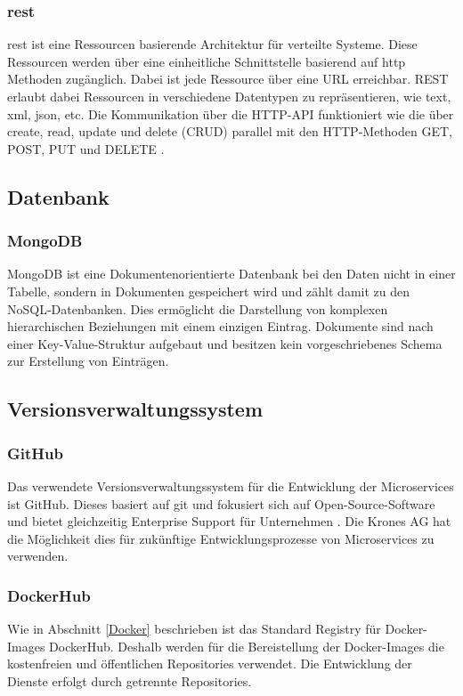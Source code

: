 \subsubsection{\ac{rest}}
\acs{rest} ist eine Ressourcen basierende Architektur für verteilte Systeme.
Diese Ressourcen werden über eine einheitliche Schnittstelle basierend auf 
\acs{http} Methoden zugänglich.
Dabei ist jede Ressource über eine URL erreichbar.
REST erlaubt dabei Ressourcen in verschiedene Datentypen zu repräsentieren, wie text, xml, json, etc.
Die Kommunikation über die HTTP-API funktioniert wie die über create, read, update und delete (CRUD) parallel mit den HTTP-Methoden GET, POST, PUT und DELETE \cite{fundamentalsRestfulAPI}.

\subsection{Datenbank}

\subsubsection{MongoDB}

MongoDB ist eine Dokumentenorientierte Datenbank bei den Daten nicht in einer Tabelle, 
sondern in Dokumenten gespeichert wird und zählt damit zu den NoSQL-Datenbanken.
Dies ermöglicht die Darstellung von komplexen hierarchischen Beziehungen mit einem einzigen Eintrag.
Dokumente sind nach einer Key-Value-Struktur aufgebaut und besitzen kein vorgeschriebenes Schema zur Erstellung von Einträgen.

\subsection{Versionsverwaltungssystem}
\subsubsection{GitHub}
Das verwendete Versionsverwaltungssystem für die Entwicklung der Microservices ist GitHub.
Dieses basiert auf git und fokusiert sich auf Open-Source-Software und bietet gleichzeitig Enterprise Support für Unternehmen \cite{githubpricing}.
Die Krones AG hat die Möglichkeit dies für zukünftige Entwicklungsprozesse von Microservices zu verwenden.

\subsubsection{DockerHub}
Wie in Abschnitt \ref{Docker} beschrieben ist das Standard Registry für Docker-Images DockerHub.
Deshalb werden für die Bereistellung der Docker-Images die kostenfreien und öffentlichen Repositories verwendet.
Die Entwicklung der Dienste erfolgt durch getrennte Repositories.

